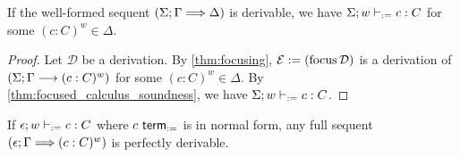 \documentclass[twoside]{report}
\begin{document}




\def\proofSkipAmount{\defaultProofSkipAmount}

\begin{proposition}
\label{thm:defocused_calculus_soundness}
If the well-formed sequent $(\Sigma; \Gamma \Longrightarrow \Delta)$ is derivable, we have $\Sigma; w \vdash_{:=} c : C$ for some $(c : C)^w \in \Delta$.
\end{proposition}

\begin{proof}
Let $\mathcal D$ be a derivation. By \cref{thm:focusing}, $\mathcal E := (\operatorname{focus} \mathcal D)$ is a derivation of $(\Sigma; \Gamma \longrightarrow (c : C)^w)$ for some $(c : C)^w \in \Delta$. By \cref{thm:focused_calculus_soundness}, we have $\Sigma; w \vdash_{:=} c : C$.
\end{proof}

\begin{proposition}
\label{thm:defocused_calculus_completeness}
If $\epsilon; w \vdash_{:=} c : C$ where $c \ \mathsf{term}_{:=}$ is in normal form, any full sequent $(\epsilon; \Gamma \Longrightarrow (c : C)^w)$ is perfectly derivable.
\end{proposition}
\end{document}
